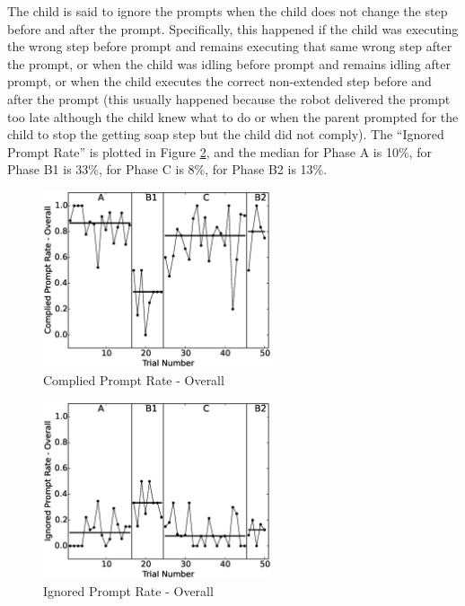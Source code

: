 \documentclass{ut-thesis}
\begin{document}
The child is said to ignore the prompts when the child does not change the step before and after the prompt.  Specifically, this happened if the child was executing the wrong step before prompt and remains executing that same wrong step after the prompt, or when the child was idling before prompt and remains idling after prompt, or when the child executes the correct non-extended step before and after the prompt (this usually happened because the robot delivered the prompt too late although the child knew what to do or when the parent prompted for the child to stop the getting soap step but the child did not comply).  The ``Ignored Prompt Rate'' is plotted in Figure \ref{fig:1IgnoredPromptRate-Overall}, and the median for Phase A is 10\%, for Phase B1 is 33\%, for Phase C is 8\%, for Phase B2 is 13\%.
\begin{figure} [h]
	\centering
	\includegraphics[width=0.6\textwidth]{./img/data_analysis/4CompliedPromptRate-Overall.eps}
	\caption{Complied Prompt Rate - Overall}
	\label{fig:4CompliedPromptRate-Overall}
\end{figure}
\begin{figure} [h]
	\centering
	\includegraphics[width=0.6\textwidth]{./img/data_analysis/1IgnoredPromptRate-Overall.eps}
	\caption{Ignored Prompt Rate - Overall}
	\label{fig:1IgnoredPromptRate-Overall}
\end{figure}
\end{document}
